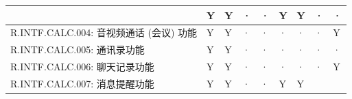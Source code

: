 \begin{table}[htbp]
\begin{tabular}{|p{9em}|p{2.5em}|p{2.5em}|p{2.5em}|p{2.5em}|p{2.5em}|
                            p{2.5em}|p{2.5em}|p{2.5em}|}
                & Y                     & Y                 & · 
                & ·                     & Y                 & Y 
                & ·                     & ·                 \\
            \hline %
            R.INTF.CALC.004: 音视频通话 (会议) 功能
                & Y                     & Y                 & · 
                & ·                     & ·                 & · 
                & ·                     & Y                 \\
            \hline %
            R.INTF.CALC.005: 通讯录功能
                & Y                     & Y                 & · 
                & ·                     & ·                 & · 
                & ·                     & ·                 \\
            \hline %
            R.INTF.CALC.006: 聊天记录功能
                & Y                     & Y                 & · 
                & ·                     & ·                 & · 
                & ·                     & Y                 \\
            \hline %
            R.INTF.CALC.007: 消息提醒功能
                & Y                     & Y                 & · 
                & ·                     & Y                 & Y 

\end{tabular}
\end{table}

